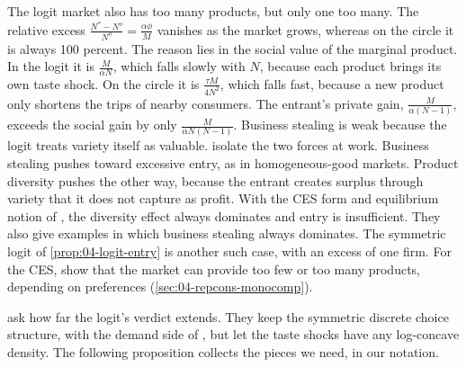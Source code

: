 The logit market also has too many products, but only one too many. The relative excess
$\frac{N^* - N^o}{N^o} = \frac{\alpha\phi}{M}$ vanishes as the market grows, whereas on the circle it is always
100 percent. The reason lies in the social value of the marginal product. In the logit it is $\frac{M}{\alpha N}$,
which falls slowly with $N$, because each product brings its own taste shock. On the circle it is
$\frac{\tau M}{4N^2}$, which falls fast, because a new product only shortens the trips of nearby consumers. The
entrant's private gain, $\frac{M}{\alpha(N - 1)}$, exceeds the social gain by only
$\frac{M}{\alpha N(N - 1)}$. Business stealing is weak because the logit treats variety itself as valuable.
 isolate the two forces at work. Business stealing pushes toward excessive entry,
as in homogeneous-good markets. Product diversity pushes the other way, because the entrant creates surplus through
variety that it does not capture as profit. With the CES form and equilibrium notion of \citet{Spence1976}, the
diversity effect always dominates and entry is insufficient. They also give examples in which business stealing
always dominates. The symmetric logit of \cref{prop:04-logit-entry} is another such case, with an excess of one firm.
For the CES, \citet{DixitStiglitz1977} show that the market can provide too few or too many products, depending on
preferences (\cref{sec:04-repcons-monocomp}).

  ask how far the logit's verdict extends. They
keep the symmetric discrete choice structure, with the demand side of \citet{PerloffSalop1985}, but let the taste
shocks have any log-concave density. The following proposition collects the pieces we need, in our notation.


